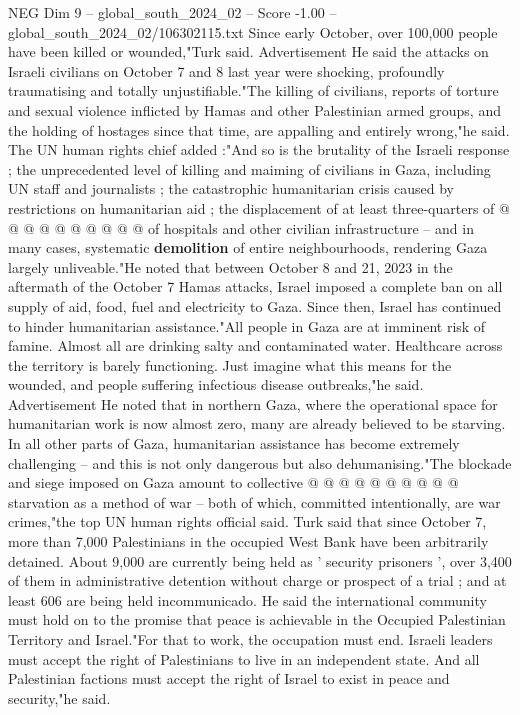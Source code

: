 \begin{textsample}{NEG Dim 9 – global\_south\_2024\_02 – Score -1.00 – global\_south\_2024\_02/106302115.txt}
Since early October, over 100,000 people have been killed or wounded,"Turk said.
Advertisement He said the attacks on Israeli civilians on October 7 and 8 last year were shocking, profoundly traumatising and totally unjustifiable."The killing of civilians, reports of torture and sexual violence inflicted by Hamas and other Palestinian armed groups, and the holding of hostages since that time, are appalling and entirely wrong,"he said.
The UN human rights chief added :"And so is the brutality of the Israeli response ; the unprecedented level of killing and maiming of civilians in Gaza, including UN staff and journalists ; the catastrophic humanitarian crisis caused by restrictions on humanitarian aid ; the displacement of at least three-quarters of @ @ @ @ @ @ @ @ @ @ of hospitals and other civilian infrastructure -- and in many cases, systematic \textbf{demolition} of entire neighbourhoods, rendering Gaza largely unliveable."He noted that between October 8 and 21, 2023 in the aftermath of the October 7 Hamas attacks, Israel imposed a complete ban on all supply of aid, food, fuel and electricity to Gaza.
Since then, Israel has continued to hinder humanitarian assistance."All people in Gaza are at imminent risk of famine.
Almost all are drinking salty and contaminated water.
Healthcare across the territory is barely functioning.
Just imagine what this means for the wounded, and people suffering infectious disease outbreaks,"he said.
Advertisement He noted that in northern Gaza, where the operational space for humanitarian work is now almost zero, many are already believed to be starving.
In all other parts of Gaza, humanitarian assistance has become extremely challenging -- and this is not only dangerous but also dehumanising."The blockade and siege imposed on Gaza amount to collective @ @ @ @ @ @ @ @ @ @ starvation as a method of war -- both of which, committed intentionally, are war crimes,"the top UN human rights official said.
Turk said that since October 7, more than 7,000 Palestinians in the occupied West Bank have been arbitrarily detained.
About 9,000 are currently being held as ' security prisoners ', over 3,400 of them in administrative detention without charge or prospect of a trial ; and at least 606 are being held incommunicado.
He said the international community must hold on to the promise that peace is achievable in the Occupied Palestinian Territory and Israel."For that to work, the occupation must end.
Israeli leaders must accept the right of Palestinians to live in an independent state.
And all Palestinian factions must accept the right of Israel to exist in peace and security,"he said.

\end{textsample}
